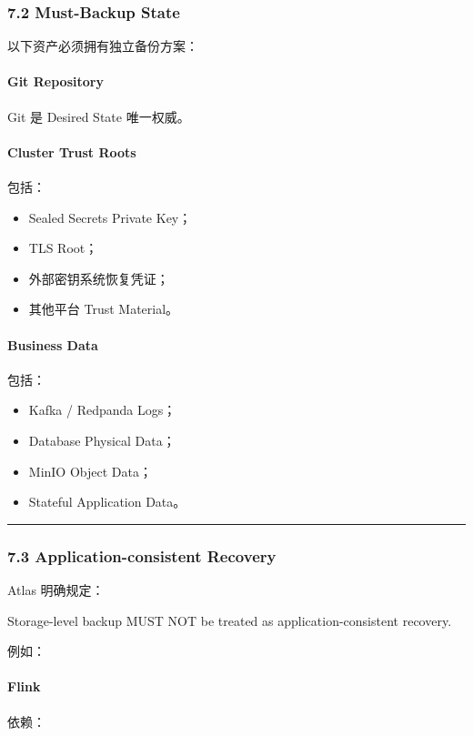 \documentclass[11pt,a4paper]{article}
\begin{document}
\subsubsection{7.2 Must-Backup State}
以下资产必须拥有独立备份方案：

\paragraph{Git Repository}
Git 是 Desired State 唯一权威。

\paragraph{Cluster Trust Roots}
包括：

\begin{itemize}
  \item Sealed Secrets Private Key；
  \item TLS Root；
  \item 外部密钥系统恢复凭证；
  \item 其他平台 Trust Material。
\end{itemize}
\paragraph{Business Data}
包括：

\begin{itemize}
  \item Kafka / Redpanda Logs；
  \item Database Physical Data；
  \item MinIO Object Data；
  \item Stateful Application Data。
\end{itemize}
\vspace{0.5em}\hrule\vspace{0.5em}
\subsubsection{7.3 Application-consistent Recovery}
Atlas 明确规定：

\begin{gfmBlockquote}
Storage-level backup MUST NOT be treated as application-consistent recovery.
\end{gfmBlockquote}
例如：

\paragraph{Flink}
依赖：
\end{document}
